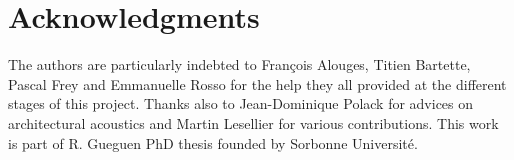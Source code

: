 \documentclass{aes2e}
\begin{document}
\section{Acknowledgments}
The authors are particularly indebted to Fran\c{c}ois Alouges, Titien Bartette, Pascal Frey and Emmanuelle Rosso for the help they all provided at the different stages of this project. Thanks also to Jean-Dominique Polack for advices on architectural acoustics and Martin Lesellier for various contributions. This work is part of R. Gueguen PhD thesis founded by Sorbonne Universit\'e.



 
\end{document}
